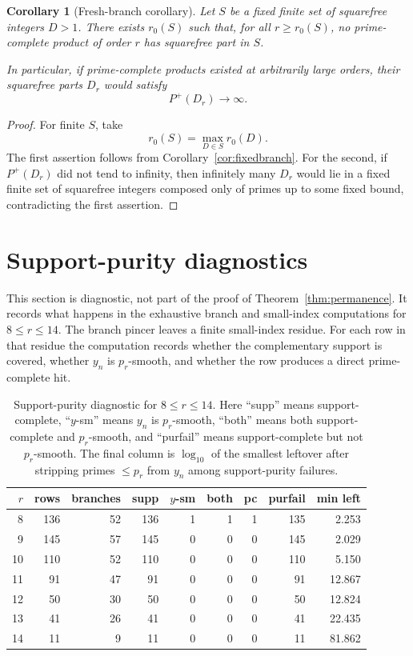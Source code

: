 \documentclass[11pt]{article}
\newtheorem{corollary}[theorem]{Corollary}
\theoremstyle{definition}
\newcommand{\Pplus}{P^{+}}
\begin{document}
\begin{corollary}[Fresh-branch corollary]\label{cor:fresh}
Let $S$ be a fixed finite set of squarefree integers $D>1$.  There exists
$r_0(S)$ such that, for all $r\ge r_0(S)$, no prime-complete product of order
$r$ has squarefree part in $S$.

In particular, if prime-complete products existed at arbitrarily large orders,
their squarefree parts $D_r$ would satisfy
\[
  \Pplus(D_r)\to\infty.
\]
\end{corollary}

\begin{proof}
For finite $S$, take
\[
  r_0(S)=\max_{D\in S}r_0(D).
\]
The first assertion follows from Corollary~\ref{cor:fixedbranch}.  For the
second, if $\Pplus(D_r)$ did not tend to infinity, then infinitely many $D_r$
would lie in a fixed finite set of squarefree integers composed only of primes up
to some fixed bound, contradicting the first assertion.
\end{proof}

\section{Support-purity diagnostics}

This section is diagnostic, not part of the proof of Theorem~\ref{thm:permanence}.
It records what happens in the exhaustive branch and small-index computations for
$8\le r\le 14$.  The branch pincer leaves a finite small-index residue.  For each
row in that residue the computation records whether the complementary support is
covered, whether $y_n$ is $p_r$-smooth, and whether the row produces a direct
prime-complete hit.

\begin{table}[H]
\centering
\small
\begin{tabular}{rrrrrrrrr}
\toprule
$r$ & rows & branches & supp & $y$-sm & both & pc & purfail & min left \\
\midrule
8  & 136 & 52 & 136 & 1 & 1 & 1 & 135 & 2.253 \\
9  & 145 & 57 & 145 & 0 & 0 & 0 & 145 & 2.029 \\
10 & 110 & 52 & 110 & 0 & 0 & 0 & 110 & 5.150 \\
11 & 91  & 47 & 91  & 0 & 0 & 0 & 91  & 12.867 \\
12 & 50  & 30 & 50  & 0 & 0 & 0 & 50  & 12.824 \\
13 & 41  & 26 & 41  & 0 & 0 & 0 & 41  & 22.435 \\
14 & 11  & 9  & 11  & 0 & 0 & 0 & 11  & 81.862 \\
\bottomrule
\end{tabular}
\caption{Support-purity diagnostic for $8\le r\le 14$.  Here ``supp'' means
support-complete, ``$y$-sm'' means $y_n$ is $p_r$-smooth, ``both'' means both
support-complete and $p_r$-smooth, and ``purfail'' means support-complete but not
$p_r$-smooth.  The final column is $\log_{10}$ of the smallest leftover after
stripping primes $\le p_r$ from $y_n$ among support-purity failures.}
\label{tab:purity-order}
\end{table}
\end{document}

